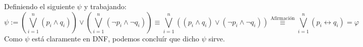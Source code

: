 \begin{enumerate}
Definiendo el siguiente $\psi$ y trabajando:
\[
\psi:=\left(\bigvee_{i=1}^n(p_i \land q_i)\right) \lor \left(\bigvee_{i=1}^n(\neg p_i \land \neg q_i)\right) \equiv \bigvee_{i=1}^n((p_i \land q_i)\lor (\neg p_i \land \neg q_i) ) \stackrel{\text{Afirmación}}{\equiv} \bigvee_{i=1}^n (p_i\leftrightarrow q_i)= \varphi
\]
Como $\psi$ está claramente en DNF, podemos concluír que dicho $\psi$ sirve.
\end{enumerate}